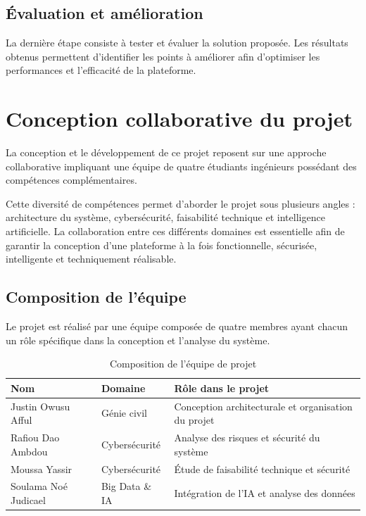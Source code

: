 \documentclass[12pt,a4paper]{report}
\begin{document}
\section{Évaluation et amélioration}
La dernière étape consiste à tester et évaluer la solution proposée. Les résultats obtenus permettent d'identifier les points à améliorer afin d'optimiser les performances et l'efficacité de la plateforme.


\chapter{Conception collaborative du projet}
La conception et le développement de ce projet reposent sur une approche collaborative impliquant une équipe de quatre étudiants ingénieurs possédant des compétences complémentaires.

Cette diversité de compétences permet d'aborder le projet sous plusieurs angles : architecture du système, cybersécurité, faisabilité technique et intelligence artificielle. La collaboration entre ces différents domaines est essentielle afin de garantir la conception d'une plateforme à la fois fonctionnelle, sécurisée, intelligente et techniquement réalisable.

\section{Composition de l'équipe}
Le projet est réalisé par une équipe composée de quatre membres ayant chacun un rôle spécifique dans la conception et l'analyse du système.

\begin{table}[H]
\centering
\begin{tabular}{@{}lll@{}}
\toprule
\textbf{Nom} & \textbf{Domaine} & \textbf{Rôle dans le projet} \\ \midrule
Justin Owusu Afful & Génie civil & Conception architecturale et organisation du projet \\
Rafiou Dao Ambdou & Cybersécurité & Analyse des risques et sécurité du système \\
Moussa Yassir & Cybersécurité & Étude de faisabilité technique et sécurité \\
Soulama Noé Judicael & Big Data \& IA & Intégration de l'IA et analyse des données \\ \bottomrule
\end{tabular}
\caption{Composition de l'équipe de projet}
\end{table}
\end{document}
